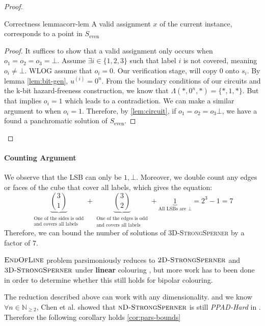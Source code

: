 \begin{proof}
\begin{lemmabox}{Correctness lemma}{corr-lem}
    A valid assignment $x$ of the current instance, corresponds to a point in $S_{\text{even}}$
\end{lemmabox}

\begin{proof}
    It suffices to show that a valid assignment only occurs when $o_1 = o_2 = o_3 = \bot$. Assume
    $\exists i \in \{1,2,3\}$ such that label $i$ is not covered, meaning $o_i \neq \bot$.
    WLOG assume that $o_i = 0$. Our verification stage, will copy $0$ onto $s_i$. By lemma \ref{lem:bit-gen}, $u^{(i)} = 0^n$. From the boundary
    conditions of our circuits and the k-bit hazard-freeness construction,
    we know that $\Lambda(*, 0^n, *) = \{*, 1,  *\}$. But that implies
    $o_i = 1$ which leads to a contradiction. We can make a similar argument to when $o_i = 1$.
    Therefore, by \ref{lem:circuit}, if $o_1 = o_2 = o_3\bot$, we have a found a panchromatic
    solution of $S_\text{even}$.
\end{proof}

\end{proof}
\paragraph*{Counting Argument}
We observe that the LSB can only be $1,\bot$.
Moreover, we double count any edges or faces of the cube that cover all labels, which gives the equation:
$$
\underbrace{\binom{3}{1}}_{\substack{\text{One of the sides is odd} \\ \text{and covers all labels}}}
+ \underbrace{\binom{3}{2}}_{\substack{\text{One of the edges is odd} \\ \text{and covers all labels}}}
+ \underbrace{1}_{\text{All LSBs are } \bot} = 2^3 - 1 = 7
$$
Therefore, we can bound the number of solutions of \textsc{3D-StrongSperner} by a factor of $7$.


$\textsc{EndOfLine}$ problem parsimoniously reduces to $\textsc{2D-StrongSperner}$ and $\textsc{3D-StrongSperner}$
under \textbf{linear} colouring \cite{chen_Complexity2DDiscrete_2009, daskalakis_ComplexityComputingNash_2006}, but more
work has to been done in order to determine whether this still holds for bipolar colouring.


The reduction described above can work with any dimensionality.
and we know $\forall n \in \mathbb{N}_{\geq 2}$, Chen et al. showed that
$\textsc{nD-StrongSperner}$ is still \textit{PPAD-Hard} in \cite{chen_SettlingComplexityComputing_2009}.
Therefore the following corollary holds \ref{cor:pars-bounds}

